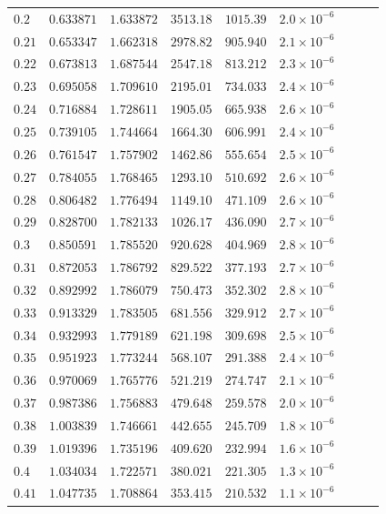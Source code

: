 \documentclass[12pt]{extarticle}
\theoremstyle{plain}
\theoremstyle{remark}
\begin{document}
\begin{longtable}{lcccccccc}
$0.2$ & $0.633871$ & $1.633872$ & $3513.18$ & $1015.39$ & $2.0\times10^{-6}$ \\
$0.21$ & $0.653347$ & $1.662318$ & $2978.82$ & $905.940$ & $2.1\times10^{-6}$ \\
$0.22$ & $0.673813$ & $1.687544$ & $2547.18$ & $813.212$ & $2.3\times10^{-6}$ \\
$0.23$ & $0.695058$ & $1.709610$ & $2195.01$ & $734.033$ & $2.4\times10^{-6}$ \\
$0.24$ & $0.716884$ & $1.728611$ & $1905.05$ & $665.938$ & $2.6\times10^{-6}$ \\
$0.25$ & $0.739105$ & $1.744664$ & $1664.30$ & $606.991$ & $2.4\times10^{-6}$ \\
$0.26$ & $0.761547$ & $1.757902$ & $1462.86$ & $555.654$ & $2.5\times10^{-6}$ \\
$0.27$ & $0.784055$ & $1.768465$ & $1293.10$ & $510.692$ & $2.6\times10^{-6}$ \\
$0.28$ & $0.806482$ & $1.776494$ & $1149.10$ & $471.109$ & $2.6\times10^{-6}$ \\
$0.29$ & $0.828700$ & $1.782133$ & $1026.17$ & $436.090$ & $2.7\times10^{-6}$ \\
$0.3$ & $0.850591$ & $1.785520$ & $920.628$ & $404.969$ & $2.8\times10^{-6}$ \\
$0.31$ & $0.872053$ & $1.786792$ & $829.522$ & $377.193$ & $2.7\times10^{-6}$ \\
$0.32$ & $0.892992$ & $1.786079$ & $750.473$ & $352.302$ & $2.8\times10^{-6}$ \\
$0.33$ & $0.913329$ & $1.783505$ & $681.556$ & $329.912$ & $2.7\times10^{-6}$ \\
$0.34$ & $0.932993$ & $1.779189$ & $621.198$ & $309.698$ & $2.5\times10^{-6}$ \\
$0.35$ & $0.951923$ & $1.773244$ & $568.107$ & $291.388$ & $2.4\times10^{-6}$ \\
$0.36$ & $0.970069$ & $1.765776$ & $521.219$ & $274.747$ & $2.1\times10^{-6}$ \\
$0.37$ & $0.987386$ & $1.756883$ & $479.648$ & $259.578$ & $2.0\times10^{-6}$ \\
$0.38$ & $1.003839$ & $1.746661$ & $442.655$ & $245.709$ & $1.8\times10^{-6}$ \\
$0.39$ & $1.019396$ & $1.735196$ & $409.620$ & $232.994$ & $1.6\times10^{-6}$ \\
$0.4$ & $1.034034$ & $1.722571$ & $380.021$ & $221.305$ & $1.3\times10^{-6}$ \\
$0.41$ & $1.047735$ & $1.708864$ & $353.415$ & $210.532$ & $1.1\times10^{-6}$ \\

\end{longtable}
\end{document}
